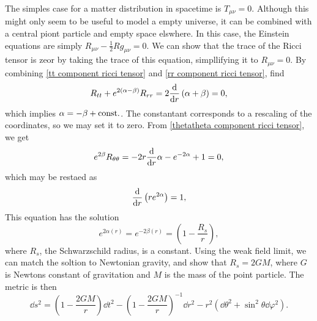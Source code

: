 The simples case for a matter distribution in spacetime is $T_{\mu \nu} = 0$.
Although this might only seem to be useful to model a empty universe, it can be combined with a central piont particle and empty space elswhere.
In this case, the Einstein equations are simply $R_{\mu \nu} - \frac{1}{2}R g_{\mu \nu} = 0$.
We can show that the trace of the Ricci tensor is zeor by taking the trace of this equation, simpllifying it to $R_{\mu \nu} = 0$.
By combining \autoref{tt component ricci tensor} and \autoref{rr component ricci tensor}, find
%
\begin{equation}
    R_{tt} + e^{2(\alpha - \beta)}R_{rr} = 2 \dv{}{r} \left(\alpha + \beta\right) = 0,
\end{equation}
%
which implies $\alpha = -\beta + \mathrm{const.}$.
The constantant corresponds to a rescaling of the coordinates, so we may set it to zero.
From \autoref{thetatheta component ricci tensor}, we get
%
\begin{equation}
    e^{2 \beta} R_{\theta \theta} = - 2 r\odv{}{r} \alpha - e^{-2\alpha} + 1 = 0,
\end{equation}
%
which may be restaed as
%
\begin{equation}
    \odv{}{r} \left(r e^{2 \alpha}\right) = 1,
\end{equation}
%
This equation has the solution
%
\begin{equation}
    e^{2\alpha(r)} = e^{-2 \beta(r)} = \left( 1- \frac{R_s}{r} \right),
\end{equation}
%
where $R_s$, the Schwarzschild radius, is a constant.
Using the weak field limit, we can match the soltion to Newtonian gravity, and show that $R_s = 2 G M$, where $G$ is Newtons constant of gravitation and $M$ is the mass of the point particle.
The metric is then
%
\begin{equation}
    \label{Schwarzchild metric}
    \dd s^2 
    = 
    \left( 1 - \frac{2 G M}{r} \right) \dd t^2
    -\left( 1 - \frac{2 G M}{r} \right)^{-1} \dd r^2
    - r^2 \left(\dd \theta^2 + \sin^2 \theta \dd \varphi^2\right).
\end{equation}
%





